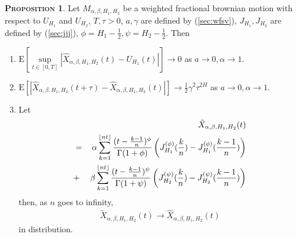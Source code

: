 \documentclass[a4paper, twoside, 11pt]{article}
\theoremstyle{definition}
\newtheorem{proposition}[definition]{\scshape Proposition}
\DeclarePairedDelimiter\floor{\lfloor}{\rfloor}
\newcommand{\brkt}[1]{\left({#1} \right)}
\begin{document}
\begin{proposition}
  Let $M_{\alpha,\beta,H_1,H_2}$ be a weighted fractional brownian motion with respect to $U_{H_1}$ and $U_{H_2}$, $T, \tau>0$, $a, \gamma$ are defined by (\ref{sec:wfsv}), $J_{H_1}, J_{H_2}$ are defined by (\ref{sec:jjj}), $\phi=H_1-\frac{1}{2}, \psi=H_2-\frac{1}{2}$. Then
\begin{enumerate}[topsep=0pt, itemsep=-1ex, partopsep=1ex, parsep=1ex, label=(\roman*)]	
  \item $\mathrm{E}[\sup\limits_{t\in[0,T]}|\hat{X}_{\alpha,\beta,H_1,H_2}(t) - U_{H_1}(t)|] \rightarrow 0$
	as $a\rightarrow 0, \alpha\rightarrow 1$.
  \item $\mathrm{E}[|\hat{X}_{\alpha,\beta,H_1,H_2}(t+\tau) - \hat{X}_{\alpha,\beta,H_1,H_2}(t)|] \rightarrow \frac{1}{2}  \gamma^2 \tau^{2H}$
	as $a\rightarrow 0, \alpha\rightarrow 1$.
  \item Let 
	\begin{eqnarray}
	  &&\tilde{X}_{\alpha,\beta,H_1,H_2}(t) \\
	  &=&  \alpha\sum_{k=1}^{\floor{nt}} \frac{(t - \frac{k-1}{n})^\phi}{\Gamma(1+\phi)} \brkt{J_{H_1}^{(\phi)}(\frac{k}{n}) - J_{H_1}^{(\phi)}(\frac{k-1}{n})} \\
	  &+& \beta\sum_{k=1}^{\floor{nt}} \frac{(t - \frac{k-1}{n})^\psi}{\Gamma(1+\psi)} \brkt{J_{H_2}^{(\psi)}(\frac{k}{n}) - J_{H_2}^{(\psi)}(\frac{k-1}{n})}
	  \label{sec:disc}
	\end{eqnarray}
	then, as $n$ goes to infinity,
	\begin{eqnarray*}
	  \tilde{X}_{\alpha,\beta,H_1,H_2}(t) \rightarrow \hat{X}_{\alpha,\beta,H_1,H_2}(t)
	\end{eqnarray*}
	in distribution.
  \end{enumerate}
  \end{proposition}
\end{document}
